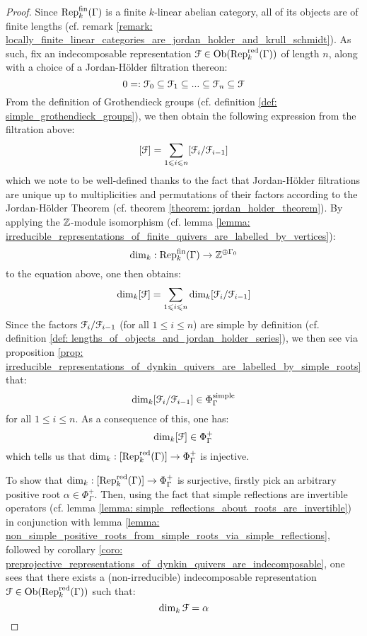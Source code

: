                 \begin{proof}
                    Since $\mathrm{Rep}_k^{\mathrm{fin}}(\Gamma)$ is a finite $k$-linear abelian category, all of its objects are of finite lengths (cf. remark \ref{remark: locally_finite_linear_categories_are_jordan_holder_and_krull_schmidt}). As such, fix an indecomposable representation $\mathcal{F} \in \mathrm{Ob}(\mathrm{Rep}_k^{\mathrm{red}}(\Gamma))$ of length $n$, along with a choice of a Jordan-H\"older filtration thereon:
                        $$0 =: \mathcal{F}_0 \subseteq \mathcal{F}_1 \subseteq ... \subseteq \mathcal{F}_n \subseteq \mathcal{F}$$
                    From the definition of Grothendieck groups (cf. definition \ref{def: simple_grothendieck_groups}), we then obtain the following expression from the filtration above:
                        $$[\mathcal{F}] = \sum_{1 \leqslant i \leqslant n} [\mathcal{F}_i/\mathcal{F}_{i - 1}]$$
                    which we note to be well-defined thanks to the fact that Jordan-H\"older filtrations are unique up to multiplicities and permutations of their factors according to the Jordan-H\"older Theorem (cf. theorem \ref{theorem: jordan_holder_theorem}). By applying the $\mathbb{Z}$-module isomorphism (cf. lemma \ref{lemma: irreducible_representations_of_finite_quivers_are_labelled_by_vertices}):
                        $$\dim_k: \mathrm{Rep}_k^{\mathrm{fin}}(\Gamma) \to \mathbb{Z}^{\oplus \Gamma_0}$$
                    to the equation above, one then obtains:
                        $$\dim_k [\mathcal{F}] = \sum_{1 \leqslant i \leqslant n} \dim_k [\mathcal{F}_i/\mathcal{F}_{i - 1}]$$
                    Since the factors $\mathcal{F}_i/\mathcal{F}_{i - 1}$ (for all $1 \leq i \leq n$) are simple by definition (cf. definition \ref{def: lengths_of_objects_and_jordan_holder_series}), we then see via proposition \ref{prop: irreducible_representations_of_dynkin_quivers_are_labelled_by_simple_roots} that:
                        $$\dim_k [\mathcal{F}_i/\mathcal{F}_{i - 1}] \in \Phi_{\Gamma}^{\mathrm{simple}}$$
                    for all $1 \leq i \leq n$. As a consequence of this, one has:
                        $$\dim_k [\mathcal{F}] \in \Phi_{\Gamma}^+$$
                    which tells us that $\dim_k: [\mathrm{Rep}_k^{\mathrm{red}}(\Gamma)] \to \Phi_{\Gamma}^+$ is injective.
                    
                    To show that $\dim_k: [\mathrm{Rep}_k^{\mathrm{red}}(\Gamma)] \to \Phi_{\Gamma}^+$ is surjective, firstly pick an arbitrary positive root $\alpha \in \Phi_{\Gamma}^+$. Then, using the fact that simple reflections are invertible operators (cf. lemma \ref{lemma: simple_reflections_about_roots_are_invertible}) in conjunction with lemma \ref{lemma: non_simple_positive_roots_from_simple_roots_via_simple_reflections}, followed by corollary \ref{coro: preprojective_representations_of_dynkin_quivers_are_indecomposable}, one sees that there exists a (non-irreducible) indecomposable representation $\mathcal{F} \in \mathrm{Ob}(\mathrm{Rep}_k^{\mathrm{red}}(\Gamma))$ such that:
                        $$\dim_k \mathcal{F} = \alpha$$
                \end{proof}
